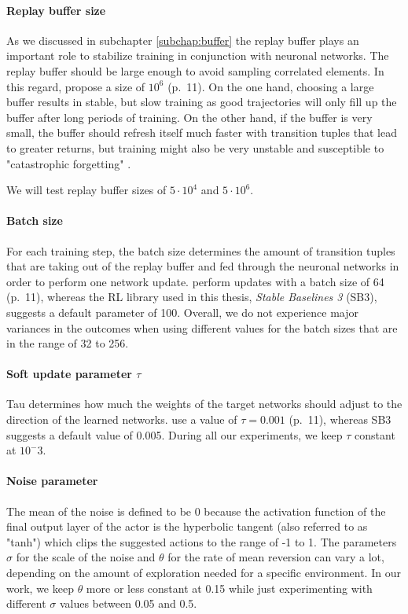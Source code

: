 \paragraph{Replay buffer size}
As we discussed in subchapter \ref{subchap:buffer} the replay buffer plays an important role to stabilize training in conjunction with neuronal networks. The replay buffer should be large enough to avoid sampling correlated elements. In this regard, \cite{lillicrap2019continuous} propose a size of $10^6$ (p.~11). On the one hand, choosing a large buffer results in stable, but slow training as good trajectories will only fill up the buffer after long periods of training. On the other hand, if the buffer is very small, the buffer should refresh itself much faster with transition tuples that lead to greater returns, but training might also be very unstable and susceptible to "catastrophic forgetting" \cite[]{mccloskey1989catastrophic}.
\par
We will test replay buffer sizes of $5\cdot 10^4$ and $5\cdot 10^6$.

\paragraph{Batch size} For each training step, the batch size determines the amount of transition tuples that are taking out of the replay buffer and fed through the neuronal networks in order to perform one network update. \cite{lillicrap2019continuous} perform updates with a batch size of 64 (p.~11), whereas the RL library used in this thesis, \textit{Stable Baselines 3} (SB3), suggests a default parameter of 100. Overall, we do not experience major variances in the outcomes when using different values for the batch sizes that are in the range of 32 to 256. 

\paragraph{Soft update parameter $\tau$} Tau determines how much the weights of the target networks should adjust to the direction of the learned networks. \cite{lillicrap2019continuous} use a value of $\tau = 0.001$ (p.~11), whereas SB3 suggests a default value of 0.005. During all our experiments, we keep $\tau$ constant at $10^-3$.

\paragraph{Noise parameter} The mean of the noise is defined to be 0 because the activation function of the final output layer of the actor is the hyperbolic tangent (also referred to as "tanh") which clips the suggested actions to the range of -1 to 1. The parameters $\sigma$ for the scale of the noise and $\theta$ for the rate of mean reversion can vary a lot, depending on the amount of exploration needed for a specific environment. In our work, we keep $\theta$ more or less constant at 0.15 while just experimenting with different $\sigma$ values between 0.05 and 0.5. 